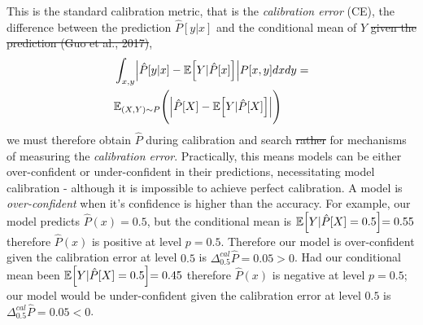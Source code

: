 \documentclass[10pt]{article}[draft]
\begin{document}
This is the standard calibration metric, that is the \emph{calibration error} (CE), the difference between the	prediction $\hat{P}[y|x]$ and the conditional mean of $Y$ \st{given the prediction (Guo et al., 2017)},
\begin{equation}
	\begin{split}
    	& \int_{x,y}  \Bigr|  \hat{P}[y|x] - \mathbb{E}\Bigr[ Y | \hat{P}[x]\Bigl] \Bigl| P[x,y] dx dy = \\
		& 	\mathbb{E}_{(X,Y)\sim P } \Biggl( \Bigl|  \hat{P}[X] - \mathbb{E}\Bigr[ Y | \hat{P}[X]\Bigl] \Bigr| \Biggr)
	\end{split}
\end{equation}
we must therefore obtain $\hat{P}$ during calibration and search \st{rather} for mechanisms of measuring the \emph{calibration error}. Practically, this means models can be either over-confident or under-confident in their predictions, necessitating model calibration - although it is impossible to achieve perfect calibration.  A model is \emph{over-confident} when it's confidence is higher than the  accuracy. For example, our model predicts $\hat{P}(x) = 0.5$, but the conditional mean is $ \mathbb{E}\Bigr[ Y | \hat{P}[X] = 0.5 \Bigl] = 0.55 $ therefore  $\hat{P}(x)$ is positive at level $p = 0.5$.  Therefore our model is over-confident given the calibration error at level $0.5$ is $\Delta_{0.5}^{cal} \hat{P} = 0.05 > 0$. Had our conditional mean been $ \mathbb{E}\Bigr[ Y | \hat{P}[X] = 0.5 \Bigl] = 0.45$  therefore  $\hat{P}(x)$ is negative at level $p = 0.5$;  our model would be under-confident given the calibration error at level $0.5$ is $\Delta_{0.5}^{cal} \hat{P} = 0.05 < 0$.
\end{document}
